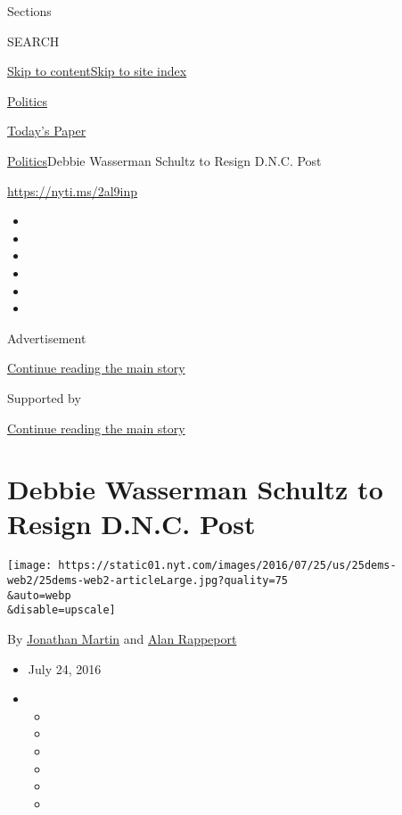 Sections

SEARCH

\protect\hyperlink{site-content}{Skip to
content}\protect\hyperlink{site-index}{Skip to site index}

\href{https://www.nytimes.com/section/politics}{Politics}

\href{https://myaccount.nytimes.com/auth/login?response_type=cookie\&client_id=vi}{}

\href{https://www.nytimes.com/section/todayspaper}{Today's Paper}

\href{/section/politics}{Politics}\textbar{}Debbie Wasserman Schultz to
Resign D.N.C. Post

\url{https://nyti.ms/2al9inp}

\begin{itemize}
\item
\item
\item
\item
\item
\item
\end{itemize}

Advertisement

\protect\hyperlink{after-top}{Continue reading the main story}

Supported by

\protect\hyperlink{after-sponsor}{Continue reading the main story}

\hypertarget{debbie-wasserman-schultz-to-resign-dnc-post}{%
\section{Debbie Wasserman Schultz to Resign D.N.C.
Post}\label{debbie-wasserman-schultz-to-resign-dnc-post}}

\texttt{[image: https://static01.nyt.com/images/2016/07/25/us/25dems-web2/25dems-web2-articleLarge.jpg?quality=75\\\&auto=webp\\\&disable=upscale]}

By \href{http://www.nytimes.com/by/jonathan-martin}{Jonathan Martin} and
\href{https://www.nytimes.com/by/alan-rappeport}{Alan Rappeport}

\begin{itemize}
\item
  July 24, 2016
\item
  \begin{itemize}
  \item
  \item
  \item
  \item
  \item
  \item
  \end{itemize}
\end{itemize}

